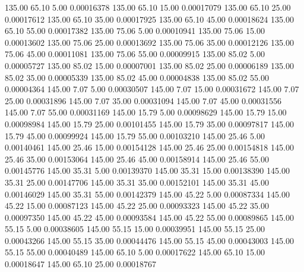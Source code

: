     135.00     65.10      5.00     0.00016378
    135.00     65.10     15.00     0.00017079
    135.00     65.10     25.00     0.00017612
    135.00     65.10     35.00     0.00017925
    135.00     65.10     45.00     0.00018624
    135.00     65.10     55.00     0.00017382
    135.00     75.06      5.00     0.00010941
    135.00     75.06     15.00     0.00013602
    135.00     75.06     25.00     0.00013692
    135.00     75.06     35.00     0.00012126
    135.00     75.06     45.00     0.00011081
    135.00     75.06     55.00     0.00009915
    135.00     85.02      5.00     0.00005727
    135.00     85.02     15.00     0.00007001
    135.00     85.02     25.00     0.00006189
    135.00     85.02     35.00     0.00005339
    135.00     85.02     45.00     0.00004838
    135.00     85.02     55.00     0.00004364
    145.00      7.07      5.00     0.00030507
    145.00      7.07     15.00     0.00031672
    145.00      7.07     25.00     0.00031896
    145.00      7.07     35.00     0.00031094
    145.00      7.07     45.00     0.00031556
    145.00      7.07     55.00     0.00031169
    145.00     15.79      5.00     0.00098629
    145.00     15.79     15.00     0.00098984
    145.00     15.79     25.00     0.00101455
    145.00     15.79     35.00     0.00097817
    145.00     15.79     45.00     0.00099924
    145.00     15.79     55.00     0.00103210
    145.00     25.46      5.00     0.00140461
    145.00     25.46     15.00     0.00154128
    145.00     25.46     25.00     0.00154818
    145.00     25.46     35.00     0.00153064
    145.00     25.46     45.00     0.00158914
    145.00     25.46     55.00     0.00145776
    145.00     35.31      5.00     0.00139370
    145.00     35.31     15.00     0.00138390
    145.00     35.31     25.00     0.00147706
    145.00     35.31     35.00     0.00152101
    145.00     35.31     45.00     0.00146029
    145.00     35.31     55.00     0.00142379
    145.00     45.22      5.00     0.00087334
    145.00     45.22     15.00     0.00087123
    145.00     45.22     25.00     0.00093323
    145.00     45.22     35.00     0.00097350
    145.00     45.22     45.00     0.00093584
    145.00     45.22     55.00     0.00089865
    145.00     55.15      5.00     0.00038605
    145.00     55.15     15.00     0.00039951
    145.00     55.15     25.00     0.00043266
    145.00     55.15     35.00     0.00044476
    145.00     55.15     45.00     0.00043003
    145.00     55.15     55.00     0.00040489
    145.00     65.10      5.00     0.00017622
    145.00     65.10     15.00     0.00018647
    145.00     65.10     25.00     0.00018767
